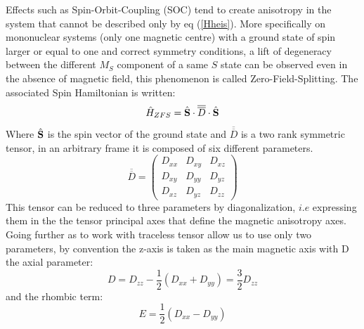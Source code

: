 \documentclass[10pt]{report}
\numberwithin{equation}{section}
\begin{document}
\par Effects such as Spin-Orbit-Coupling (SOC) tend to create anisotropy in the system that cannot be described only by eq (\ref{Hheis}). 
More specifically on mononuclear systems (only one magnetic centre) with a ground state of spin larger or equal to one and correct symmetry conditions, a lift of degeneracy between the different $M_S$ component of a same $S$ state can be observed even in the absence of magnetic field, this phenomenon is called Zero-Field-Splitting.
The associated Spin Hamiltonian is written:
\begin{equation}\label{SDS}
    \hat{H}_{ZFS}=\hat{\vb S} \cdot \overline{\overline{D}} \cdot \hat{\vb S}
\end{equation}
Where $\hat{\vb S}$ is the spin vector of the ground state and $\overline{\overline{D}}$ is a two rank symmetric tensor, in an arbitrary frame it is composed of six different parameters.
\begin{equation}
    \overline{\overline{D}}=\begin{pmatrix}
        D_{xx} & D_{xy} & D_{xz}\\
        D_{xy} & D_{yy} & D_{yz}\\
        D_{xz} & D_{yz} & D_{zz}
    \end{pmatrix}
\end{equation}
This tensor can be reduced to three parameters by diagonalization, $\textit{i.e}$ expressing them in the the tensor principal axes that define the magnetic anisotropy axes.
Going further as to work with traceless tensor allow us to use only two parameters, by convention the z-axis is taken as the main magnetic axis with D the axial parameter:
\begin{equation}\label{ParametreD}
    D=D_{zz}-\frac{1}{2}(D_{xx}+D_{yy})=\frac{3}{2}D_{zz}
\end{equation}
and the rhombic term:
\begin{equation}\label{ParametreE}
    E=\frac{1}{2}(D_{xx}-D_{yy})
\end{equation}
\end{document}
